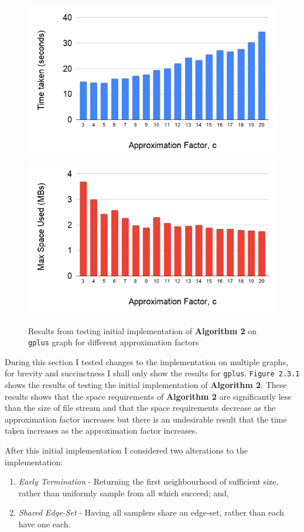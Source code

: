 \documentclass[11pt,twoside,a4paper]{report}
\begin{document}
\begin{figure}[H]
	\label{Figure 2}
	\includegraphics[width=.5\textwidth]{img/gplusInitialTime.png}
	\includegraphics[width=.5\textwidth]{img/gplusInitialSpace.png}
	\caption{Results from testing initial implementation of \textbf{Algorithm 2} on \texttt{gplus} graph for different approximation factors}
\end{figure}

\par During this section I tested changes to the implementation on multiple graphs, for brevity and succinctness I shall only show the results for \texttt{gplus}. \texttt{Figure 2.3.1} shows the results of testing the initial implementation of \textbf{Algorithm 2}. These results shows that the space requirements of \textbf{Algorithm 2} are significantly less than the size of file stream and that the space requirements decrease as the approximation factor increases but there is an undesirable result that the time taken increases as the approximation factor increases.

\par After this initial implementation I considered two alterations to the implementation:
\begin{enumerate}
	\item \textit{Early Termination} - Returning the first neighbourhood of sufficient size, rather than uniformly sample from all which succeed; and,
	\item \textit{Shared Edge-Set} - Having all samplers share an edge-set, rather than each have one each.
\end{enumerate}
\end{document}

